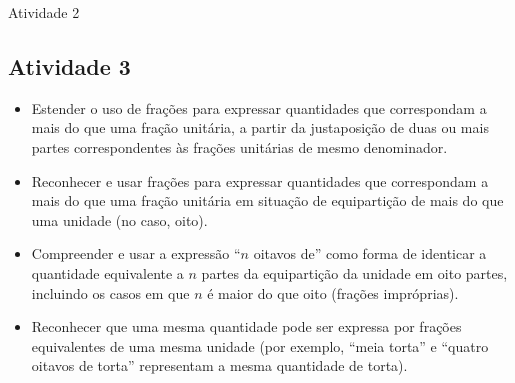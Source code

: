 \documentclass[oneside]{book}
\begin{document}
\begin{multicols}{2}
\begin{resposta*}{Atividade 2}
\end{resposta*}




\subsection{Atividade 3}

   \vspace{.1cm}
  
\begin{itemize} %
    \item       Estender o uso de frações para expressar quantidades que correspondam a mais do que uma fração unitária, a partir da justaposição de duas ou mais partes correspondentes às frações unitárias de mesmo denominador.
    \item       Reconhecer e usar frações para expressar quantidades que correspondam a mais do que uma fração unitária em situação de equipartição de mais do que uma unidade (no caso, oito).
    \item       Compreender e usar a expressão       ``$n$ oitavos de''       como forma de identicar a quantidade equivalente a       $n$       partes da equipartição da unidade em oito partes, incluindo os casos em que       $n$       é maior do que oito (frações impróprias).
    \item       Reconhecer que uma mesma quantidade pode ser expressa por frações equivalentes de uma mesma unidade (por exemplo,       ``meia torta''       e       ``quatro oitavos de torta''       representam a mesma quantidade de torta).
\end{itemize} %


  \vspace{.1cm}
  
  \vspace{.1cm}


\end{multicols}
\end{document}
